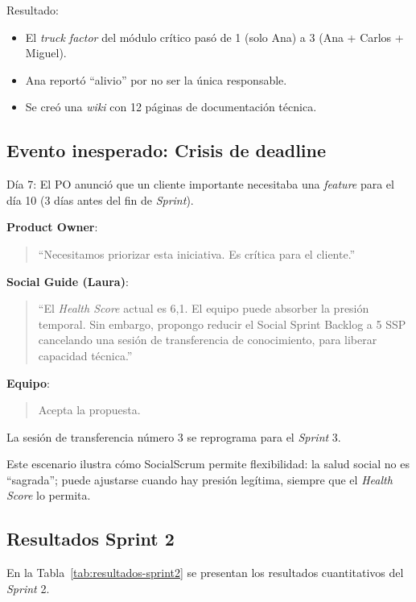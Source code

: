 Resultado:
\begin{itemize}
    \item El \textit{truck factor} del módulo crítico pasó de 1 (solo Ana) a 3 (Ana + Carlos + Miguel).
    \item Ana reportó ``alivio'' por no ser la única responsable.
    \item Se creó una \textit{wiki} con 12 páginas de documentación técnica.
\end{itemize}

\subsection{Evento inesperado: Crisis de deadline}

Día 7: El PO anunció que un cliente importante necesitaba una \textit{feature} para el día 10 (3 días antes del fin de \textit{Sprint}).

\begin{escenario}
    \textbf{Product Owner}:
    \begin{quote}
        ``Necesitamos priorizar esta iniciativa. Es crítica para el cliente.''
    \end{quote}
    \textbf{Social Guide (Laura)}:
    \begin{quote}
        ``El \textit{Health Score} actual es 6,1. El equipo puede absorber la presión temporal. Sin embargo, propongo reducir el Social Sprint Backlog a 5 SSP cancelando una sesión de transferencia de conocimiento, para liberar capacidad técnica.''
    \end{quote}
    \textbf{Equipo}:
    \begin{quote}
        Acepta la propuesta.
    \end{quote}
    La sesión de transferencia número 3 se reprograma para el \textit{Sprint} 3.

\end{escenario}

Este escenario ilustra cómo SocialScrum permite flexibilidad: la salud social no es ``sagrada''; puede ajustarse cuando hay presión legítima, siempre que el \textit{Health Score} lo permita.

\subsection{Resultados Sprint 2}

En la Tabla~\ref{tab:resultados-sprint2} se presentan los resultados cuantitativos del \textit{Sprint} 2.

